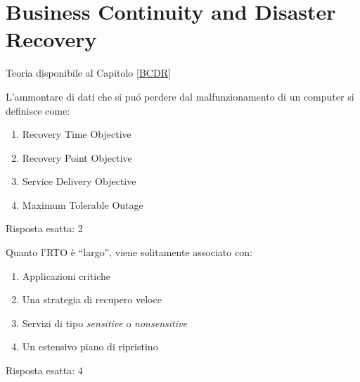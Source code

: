 \chapter{Business Continuity and Disaster Recovery}
\label{EsBCDR1}

Teoria disponibile al Capitolo \ref{BCDR}

\begin{Exercise} [
  title={Definizioni},
  label={bcdr1}
 ]

 \Question L'ammontare di dati che si puó perdere dal malfunzionamento di
un computer si definisce come:
\begin{enumerate}
  \item Recovery Time Objective
  \item Recovery Point Objective
  \item Service Delivery Objective
  \item Maximum Tolerable Outage
\end{enumerate}

\end{Exercise}

\begin{Answer} [
   ref={bcdr1},
   number={1}
 ]

  \Question Risposta esatta: 2

\end{Answer}


\begin{Exercise} [
  title={RTO Largo},
  label={bcdr2}
 ]

 \Question Quanto l'RTO è ``largo'', viene solitamente associato con:
\begin{enumerate}
  \item Applicazioni critiche
  \item Una strategia di recupero veloce
  \item Servizi di tipo \textit{sensitive} o \textit{nonsensitive}
  \item Un estensivo piano di ripristino
\end{enumerate}

\end{Exercise}

\begin{Answer} [
   ref={bcdr2},
   number={2}
 ]

  \Question Risposta esatta: 4

\end{Answer}


